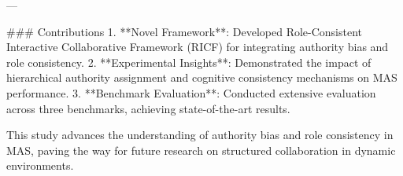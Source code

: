 ---

### Contributions
1. **Novel Framework**: Developed Role-Consistent Interactive Collaborative Framework (RICF) for integrating authority bias and role consistency.
2. **Experimental Insights**: Demonstrated the impact of hierarchical authority assignment and cognitive consistency mechanisms on MAS performance.
3. **Benchmark Evaluation**: Conducted extensive evaluation across three benchmarks, achieving state-of-the-art results.

This study advances the understanding of authority bias and role consistency in MAS, paving the way for future research on structured collaboration in dynamic environments.